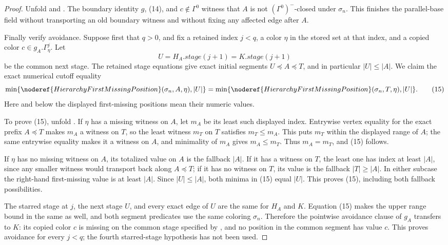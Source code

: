 \begin{proof}
Unfold  and
.  The boundary identity \(g\), (14), and
\(c\notin\Gamma^0\) witness that \(A\) is not
\((\Gamma^0)^-\)-closed under \(\sigma_n\).  This finishes the
parallel-base field without transporting an old boundary witness and
without fixing any affected edge after \(A\).

Finally verify avoidance.  Suppose first that \(q>0\), and fix a retained
index \(j<q\), a color \(\eta\) in the stored set at that index, and a
copied color \(c\in g_A.\Gamma^j_\eta\).  Let
\[
 U=H_A.\mathit{stage}(j+1)=K.\mathit{stage}(j+1)
\]
be the common next stage.  The retained stage equations give exact
initial segments \(U\preccurlyeq A\preccurlyeq T\), and in particular
\(|U|\leq|A|\).  We claim the exact numerical cutoff equality
\[
 \min\{\noderef{HierarchyFirstMissingPosition}
          (\sigma_n,A,\eta),|U|\}
 =
 \min\{\noderef{HierarchyFirstMissingPosition}
          (\sigma_n,T,\eta),|U|\}.                              \tag{15}
\]
Here and below the displayed first-missing positions mean their numeric
values.

To prove (15), unfold .  If
\(\eta\) has a missing witness on \(A\), let \(m_A\) be its least such
displayed index.  Entrywise vertex equality for the exact prefix
\(A\preccurlyeq T\) makes \(m_A\) a witness on \(T\), so the least
witness \(m_T\) on \(T\) satisfies \(m_T\leq m_A\).  This puts \(m_T\)
within the displayed range of \(A\); the same entrywise equality makes
it a witness on \(A\), and minimality of \(m_A\) gives
\(m_A\leq m_T\).  Thus \(m_A=m_T\), and (15) follows.

If \(\eta\) has no missing witness on \(A\), its totalized value on
\(A\) is the fallback \(|A|\).  If it has a witness on \(T\), the least
one has index at least \(|A|\), since any smaller witness would transport
back along \(A\preccurlyeq T\); if it has no witness on \(T\), its value
is the fallback \(|T|\geq|A|\).  In either subcase the right-hand
first-missing value is at least \(|A|\).  Since \(|U|\leq|A|\), both
minima in (15) equal \(|U|\).  This proves (15), including both fallback
possibilities.

The starred stage at \(j\), the next stage \(U\), and every exact edge of
\(U\) are the same for \(H_A\) and \(K\).  Equation (15) makes the upper
range bound in  the same as well, and
both segment predicates use the same coloring \(\sigma_n\).  Therefore
the pointwise avoidance clause of \(g_A\) transfers to \(K\): its copied
color \(c\) is missing on the common stage specified by
, and no position in the common
segment has value \(c\).  This proves avoidance for every \(j<q\); the
fourth starred-stage hypothesis has not been used.


\end{proof}
